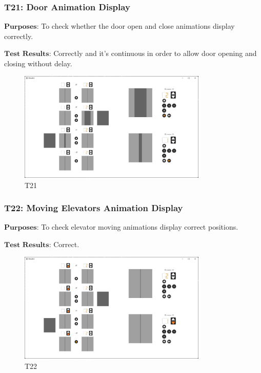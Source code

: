 \documentclass{article}
\begin{document}
\subsubsection*{T21: Door Animation Display}
$\textbf{Purposes:}$ To check whether the door open and close animations display correctly.

$\textbf{Test Results:}$ Correctly and it's continuous in order to allow door opening and closing without delay.

\begin{figure}[htbp]
    \centering
    \includegraphics[width=0.8\textwidth]{img/T21.png}
    \caption{T21}
\end{figure}

\subsubsection*{T22: Moving Elevators Animation Display}
$\textbf{Purposes:}$ To check elevator moving animations display correct positions.

$\textbf{Test Results:}$ Correct.

\begin{figure}[htbp]
    \centering
    \includegraphics[width=0.8\textwidth]{img/T22.png}
    \caption{T22}
\end{figure}
\end{document}
